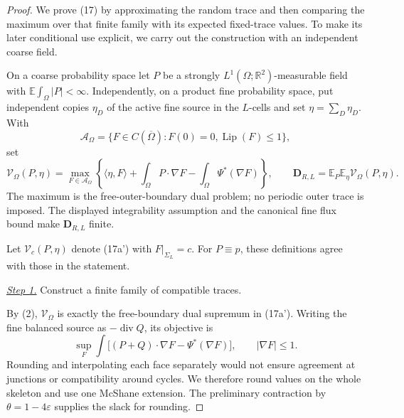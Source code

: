 \documentclass{aomart}
\theoremstyle{definition}
\newcommand{\1}{\mathbf 1}
\begin{document}
\begin{proof}
We prove (17) by approximating the random trace and then comparing the
maximum over that finite family with its expected fixed-trace values.
To make its later conditional use explicit, we carry out the construction
with an independent coarse field.

On a coarse probability space let $P$ be a strongly
$L^1(\Omega;\mathbb R^2)$-measurable field with
$\mathbb E\int_ \Omega|P|<\infty$.  Independently, on a product fine
probability space, put independent copies $\eta_ D$ of the active
fine source in the $L$-cells and set $\eta=\sum_ D\eta_ D$.  With
\begin{equation*}
\mathscr A_ \Omega=\{F\in C(\overline\Omega):F(0)=0,
\operatorname {Lip}(F)\leq1\},
\end{equation*}
set
\begin{equation}
\mathcal V_ \Omega(P,\eta)=
\max_ {F\in\mathscr A_ \Omega}
\left\{\langle\eta,F\rangle+
\int_ \Omega P\cdot\nabla F-
\int_ \Omega\Psi^*(\nabla F)\right\},\qquad
\mathbf D_ {R,L}=\mathbb E_ P\mathbb E_ \eta
\mathcal V_ \Omega(P,\eta).
\tag{17a'}
\end{equation}
The maximum is the free-outer-boundary dual problem; no periodic outer
trace is imposed.  The displayed integrability assumption and the
canonical fine flux bound make $\mathbf D_ {R,L}$ finite.

Let $\mathcal V_c(P,\eta)$ denote (17a') with
$F|_{\Sigma_L}=c$.  For $P\equiv p$, these definitions agree with
those in the statement.

\smallskip\noindent
\underline{\textit{Step 1.}} Construct a finite family of compatible traces.

By (2), $\mathcal V_ \Omega$ is exactly the free-boundary dual
supremum in (17a').
Writing the fine balanced source as $-\operatorname {div}Q$, its
objective is
\begin{equation}
\sup_ F\int\bigl[(P+Q)\cdot\nabla F-\Psi^*(\nabla F)\bigr],
\qquad |\nabla F|\leq1.
\tag{20}
\end{equation}
Rounding and interpolating each face separately would not ensure agreement
at junctions or compatibility around cycles.  We therefore round values
on the whole skeleton and use one McShane extension.  The preliminary
contraction by $\theta=1-4\varepsilon$ supplies the slack for rounding.


\end{proof}
\end{document}
